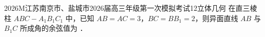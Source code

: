 
\begin{problem}{2026}{M}{江苏南京市、盐城市2026届高三年级第一次模拟考试}{12}{立体几何}
在直三棱柱 $ABC-A_1B_1C_1$ 中，已知 $AB=AC=3$，$BC=BB_1=2$，则异面直线 $AB$ 与 $B_1C$ 所成角的余弦值为 \underline{\hspace{4em}}．
\end{problem}